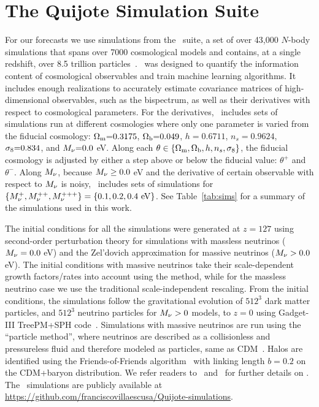 \section{The Quijote Simulation Suite} \label{sec:sims}
For our forecasts we use simulations from the \quij~suite, a set of over 43,000 
$N$-body simulations that spans over 7000 cosmological models and contains, at a single 
redshift, over 8.5 trillion particles~\citep{villaescusa-navarro2019}. 
\quij~was designed to quantify the information content of cosmological 
observables and train machine learning algorithms. It includes enough
realizations to accurately estimate covariance matrices 
of high-dimensional observables, such as the bispectrum, as well as their derivatives 
with respect to cosmological parameters. For the derivatives, 
\quij~includes sets of simulations run at different cosmologies where only 
one parameter is varied from the fiducial cosmology:
$\Omega_{\rm m}{=}0.3175$, $\Omega_{\rm b}{=}0.049$, $h{=}0.6711$, $n_s{=}0.9624$, $\sigma_8{=}0.834$, 
and $M_\nu{=}0.0$ eV. Along each $\theta \in \{\Omega_{\rm m}, \Omega_{\rm b}, h, n_s, \sigma_8\}$, the fiducial 
cosmology is adjusted by either a step above or below the fiducial value:
$\theta^{+}$ and $\theta^{-}$. 
Along $M_\nu$, because $M_\nu \ge 0.0$ eV and the derivative of certain observable 
with respect to $M_\nu$ is noisy, \quij~includes sets of simulations for 
$\{M_\nu^{+}, M_\nu^{++}, M_\nu^{+++} \} = \{0.1, 0.2, 0.4~{\rm eV}\}$. See 
Table~\ref{tab:sims} for a summary of the \quij simulations used in this work. 

The initial conditions for all the simulations were generated at $z{=}127$ using 
second-order perturbation theory for simulations with massless neutrinos 
($M_\nu = 0.0$ eV) and the Zel’dovich approximation for massive neutrinos 
($M_\nu > 0.0$ eV). The initial conditions with massive neutrinos take 
their scale-dependent growth factors/rates into account using the 
\cite{zennaro2017a} method, while for the massless neutrino case we use 
the traditional scale-independent rescaling. From the initial conditions, 
the simulations follow the gravitational evolution of $512^3$ dark matter
particles, and $512^3$ neutrino particles for $M_\nu > 0$ models, to 
$z=0$ using {\sc Gadget-III} TreePM+SPH code~\citep{springel2005}. Simulations 
with massive neutrinos are run using the ``particle method'', where neutrinos 
are described as a collisionless and pressureless fluid and therefore modeled 
as particles, same as CDM~\citep{brandbyge2008,viel2010}. Halos are identified 
using the Friends-of-Friends algorithm~\citep[FoF;][]{davis1985} with linking
length $b=0.2$ on the CDM+baryon distribution. 
We refer readers to~\cite{villaescusa-navarro2019}
and~\cite{hahn2020} for further details on \quij. The
\quij~simulations are publicly available at
\url{https://github.com/franciscovillaescusa/Quijote-simulations}.
